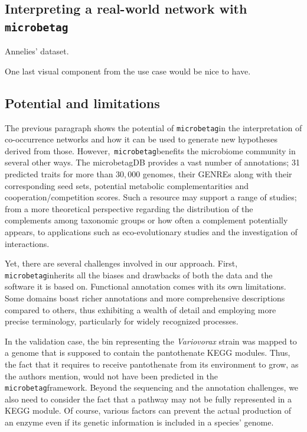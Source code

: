 \documentclass[sn-mathphys,Numbered]{sn-jnl}  %
\theoremstyle{thmstyleone}%
\theoremstyle{thmstyletwo}%
\theoremstyle{thmstylethree}%
\newcommand{\microbetag}{\texttt{microbetag}}
\begin{document}



    \subsection*{Interpreting a real-world network with \microbetag}
        \label{subsec:usecase}


        Annelies' dataset. 

        One last visual component from the use case would be nice to have.  





    \subsection*{Potential and limitations}
    \label{subsec:pot-and-limits}

        The previous paragraph shows the potential of \microbetag in the interpretation of co-occurrence networks and how it can be used to generate new hypotheses derived from those.
        However,~\microbetag benefits the microbiome community in several other ways. 
        The microbetagDB provides a vast number of annotations; 31 predicted traits for more than $30,000$ genomes, their GENREs along with their corresponding seed sets, potential metabolic complementarities and cooperation/competition scores.
        Such a resource may support a range of studies; 
        from a more theoretical perspective regarding the distribution of the complements among taxonomic groups or how often a complement potentially appears, to applications such as eco-evolutionary studies and the investigation of interactions.

        Yet, there are several challenges involved in our approach.
        First, \microbetag inherits all the biases and drawbacks of both the data and the software it is based on.
        Functional annotation comes with its own limitations.
        Some domains boast richer annotations and more comprehensive descriptions compared to others, thus exhibiting a wealth of detail and employing more precise terminology, particularly for widely recognized processes.

        In the validation case, the bin representing the \textit{Variovorax} strain was mapped to a genome that is supposed to contain the pantothenate KEGG modules.
        Thus, the fact that it requires to receive pantothenate from its environment to grow, as the authors mention, would not have been predicted in the \microbetag framework. 
        Beyond the sequencing and the annotation challenges, we also need to consider the fact that a pathway may not be fully represented in a KEGG module.
        Of course, various factors can prevent the actual production of an enzyme even if its genetic information is included in a species' genome.
        
\end{document}
